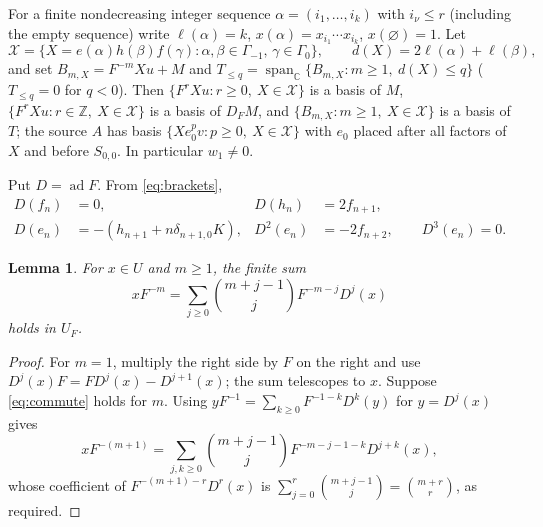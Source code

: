 \documentclass[11pt,a4paper]{article}
\newcommand{\C}{\mathbb C}
\newcommand{\Z}{\mathbb Z}
\newcommand{\ad}{\operatorname{ad}}
\newcommand{\Span}{\operatorname{span}_{\C}}
\newcommand{\X}{\mathcal X}
\newtheorem{lemma}[theorem]{Lemma}
\begin{document}
For a finite nondecreasing integer sequence $\alpha=(i_1,\ldots,i_k)$ with
$i_\nu\le r$ (including the empty sequence) write
$\ell(\alpha)=k$, $x(\alpha)=x_{i_1}\cdots x_{i_k}$,
$x(\varnothing)=1$. Let
\[
 \X=\{X=e(\alpha)h(\beta)f(\gamma):\alpha,\beta\in\Gamma_{-1},\,
 \gamma\in\Gamma_0\},\qquad d(X)=2\ell(\alpha)+\ell(\beta),
\]
and set $B_{m,X}=F^{-m}Xu+M$ and
$T_{\le q}=\Span\{B_{m,X}:m\ge1,\ d(X)\le q\}$ ($T_{\le q}=0$ for
$q<0$). Then $\{F^rXu:r\ge0,\ X\in\X\}$ is a basis of $M$,
$\{F^rXu:r\in\Z,\ X\in\X\}$ is a basis of $D_FM$, and
$\{B_{m,X}:m\ge1,\ X\in\X\}$ is a basis of $T$; the source $A$ has
basis $\{Xe_0^pv:p\ge0,\ X\in\X\}$ with $e_0$ placed after all factors
of $X$ and before $S_{0,0}$. In particular $w_1\ne0$.

Put $D=\ad F$. From \eqref{eq:brackets},
\begin{equation}\label{eq:ad}
\begin{aligned}
 D(f_n)&=0,&D(h_n)&=2f_{n+1},\\
 D(e_n)&=-(h_{n+1}+n\delta_{n+1,0}K),&
 D^2(e_n)&=-2f_{n+2},\qquad D^3(e_n)=0.
\end{aligned}
\end{equation}
\begin{lemma}\label{lem:commute}
For $x\in U$ and $m\ge1$, the finite sum
\begin{equation}\label{eq:commute}
 xF^{-m}=\sum_{j\ge0}\binom{m+j-1}{j}F^{-m-j}D^j(x)
\end{equation}
holds in $U_F$.
\end{lemma}
\begin{proof}
For $m=1$, multiply the right side by $F$ on the right and use
$D^j(x)F=FD^j(x)-D^{j+1}(x)$; the sum telescopes to $x$. Suppose
\eqref{eq:commute} holds for $m$. Using
$yF^{-1}=\sum_{k\ge0}F^{-1-k}D^k(y)$ for $y=D^j(x)$ gives
\[
 xF^{-(m+1)}=\sum_{j,k\ge0}\binom{m+j-1}{j}F^{-m-j-1-k}D^{j+k}(x),
\]
whose coefficient of $F^{-(m+1)-r}D^r(x)$ is
$\sum_{j=0}^{r}\binom{m+j-1}{j}=\binom{m+r}{r}$, as required.
\end{proof}
\end{document}
